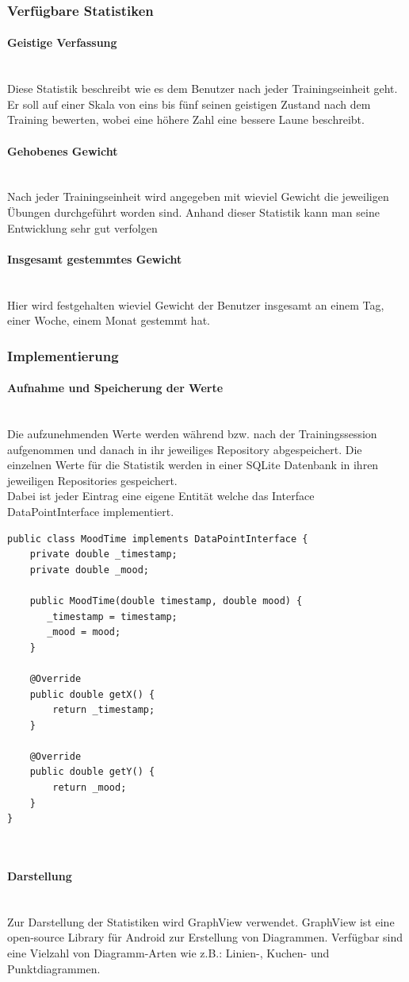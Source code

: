 \documentclass[FIPLY_base.tex]{subfiles}
\begin{document}
\newpage
\subsubsection{Verfügbare Statistiken}
\paragraph{Geistige Verfassung}\ \\
Diese Statistik beschreibt wie es dem Benutzer nach jeder Trainingseinheit geht.
Er soll auf einer Skala von eins bis fünf seinen geistigen Zustand nach dem Training bewerten, wobei eine höhere Zahl eine bessere Laune beschreibt.
\paragraph{Gehobenes Gewicht}\ \\
Nach jeder Trainingseinheit wird angegeben mit wieviel Gewicht die jeweiligen Übungen durchgeführt worden sind.
Anhand dieser Statistik kann man seine Entwicklung sehr gut verfolgen
\paragraph{Insgesamt gestemmtes Gewicht}\ \\
Hier wird festgehalten wieviel Gewicht der Benutzer insgesamt an einem Tag, einer Woche, einem Monat gestemmt hat.

\newpage
\subsubsection{Implementierung}
\paragraph{Aufnahme und Speicherung der Werte}\ \\
Die aufzunehmenden Werte werden während bzw. nach der Trainingssession aufgenommen und danach in ihr jeweiliges Repository abgespeichert.
Die einzelnen Werte für die Statistik werden in einer SQLite Datenbank in ihren jeweiligen Repositories gespeichert.
\ \\
Dabei ist jeder Eintrag eine eigene Entität welche das Interface DataPointInterface implementiert.

\begin{lstlisting}
public class MoodTime implements DataPointInterface {
    private double _timestamp;
    private double _mood;

    public MoodTime(double timestamp, double mood) {
       _timestamp = timestamp;
       _mood = mood;
    }

    @Override
    public double getX() {
        return _timestamp;
    }

    @Override
    public double getY() {
        return _mood;
    }
}
\end{lstlisting}

\ \\

\paragraph{Darstellung}\ \\
Zur Darstellung der Statistiken wird GraphView verwendet. GraphView ist eine open-source Library für Android zur Erstellung von Diagrammen.
Verfügbar sind eine Vielzahl von Diagramm-Arten wie z.B.: Linien-, Kuchen- und Punktdiagrammen.
\end{document}
